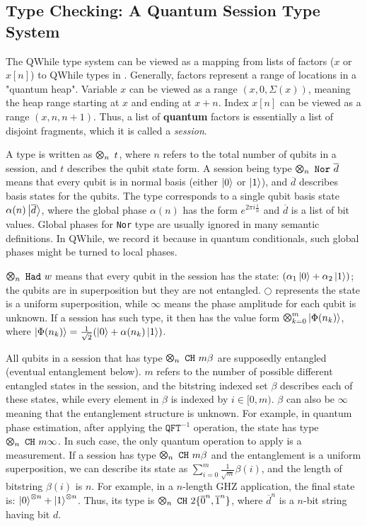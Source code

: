 \subsection{Type Checking: A Quantum Session Type System}\label{sec:typesystem}

The QWhile type system can be viewed as a mapping from lists of factors ($x$ or $x[n]$) to QWhile types in .
Generally, factors represent a range of locations in a "quantum heap".
Variable $x$ can be viewed as a range $(x,0,\Sigma(x))$, meaning the heap range starting at $x$ and ending at $x+n$.
Index $x[n]$ can be viewed as a range $(x,n,n+1)$.
Thus, a list of \textbf{quantum} factors is essentially a list of disjoint fragments, which it is called a \textit{session}.

A type is written as $\ttype{n}{t}$, where $n$ refers to the total number of qubits in a session,
and $t$ describes the qubit state form. 
A session being type $\ttype{n}{\tnor{\overline{d}}}$
means that every qubit is in normal basis (either $\left\vert{0}\right\rangle$ or $\left\vert{1}\right\rangle$),
and $\overline{d}$ describes basis states for the qubits.
The type corresponds to a single qubit basis state $\alpha(n)\left\vert{\overline{d}}\right\rangle$,
where the global phase $\alpha(n)$ has the form $e^{2 \pi i \frac{1}{n}}$ and $\overline{d}$ is a list of bit values.
Global phases for \texttt{Nor} type are usually ignored in many semantic definitions.
In QWhile, we record it because in quantum conditionals, such global phases might be turned to local phases.

$\ttype{n}{\thad{w}}$ means that every qubit in the session has the state: $(\alpha_1\left\vert{0}\right\rangle + \alpha_2\left\vert{1}\right\rangle)$;
the qubits are in superposition but they are not entangled.
$\bigcirc$ represents the state is a uniform superposition,
while $\infty$ means the phase amplitude for each qubit is unknown.
If a session has such type, it then has the value form $\Motimes_{k=0}^{m}\ket{\Phi(n_k)}$,
where $\left\vert{\Phi(n_k)}\right\rangle=\frac{1}{\sqrt{2}}(\left\vert{0}\right\rangle+\alpha(n_k)\left\vert{1}\right\rangle)$.

All qubits in a session that has type $\ttype{n}{\tch{m}{\beta}}$ are supposedly entangled (eventual entanglement below).
$m$ refers to the number of possible different entangled states in the session,
and the bitstring indexed set $\beta$ describes each of these states, while every element in $\beta$ is indexed by $i\in [0,m)$.
$\beta$ can also be $\infty$ meaning that the entanglement structure is unknown.
For example, in quantum phase estimation, after applying the $\texttt{QFT}^{-1}$ operation, the state has type $\ttype{n}{\tch{m}{\infty}}$. In such case, the only quantum operation to apply is a measurement.
If a session has type $\ttype{n}{\tch{m}{\beta}}$ and the entanglement is a uniform superposition,
we can describe its state as $\sum_{i=0}^{m}{\frac{1}{\sqrt{m}}\beta(i)}$, and the length of bitstring $\beta(i)$ is $n$.
For example, in a $n$-length GHZ application, the final state is: $\left\vert{0}\right\rangle^{\otimes n}+\left\vert{1}\right\rangle^{\otimes n}$. 
Thus, its type is $\ttype{n}{\tch{2}{\{\overline{0}^n,\overline{1}^n\}}}$, where $\overline{d}^n$ is a $n$-bit string having bit $d$.

